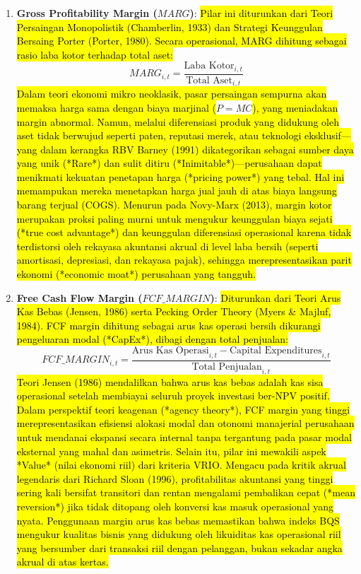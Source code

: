 \documentclass[12pt,a4paper]{article}
\providecommand{\tightlist}{%
  \setlength{\itemsep}{0pt}\setlength{\parskip}{0pt}%
}
\begin{document}
\begin{enumerate}
\def\labelenumi{\arabic{enumi}.}
\tightlist
\item
  \textbf{Gross Profitability Margin (\(MARG\))}:
  \hl{Pilar ini diturunkan dari Teori Persaingan Monopolistik (Chamberlin, 1933) dan Strategi Keunggulan Bersaing Porter (Porter, 1980). Secara operasional, MARG dihitung sebagai rasio laba kotor terhadap total aset:
  }$$MARG_{i,t} = \frac{\text{Laba Kotor}_{i,t}}{\text{Total Aset}_{i,t}}$$\hl{
  Dalam teori ekonomi mikro neoklasik, pasar persaingan sempurna akan memaksa harga sama dengan biaya marjinal (}$P=MC$\hl{), yang meniadakan margin abnormal. Namun, melalui diferensiasi produk yang didukung oleh aset tidak berwujud seperti paten, reputasi merek, atau teknologi eksklusif—yang dalam kerangka RBV Barney (1991) dikategorikan sebagai sumber daya yang unik (*Rare*) dan sulit ditiru (*Inimitable*)—perusahaan dapat menikmati kekuatan penetapan harga (*pricing power*) yang tebal. Hal ini memampukan mereka menetapkan harga jual jauh di atas biaya langsung barang terjual (COGS). Menurun pada Novy-Marx (2013), margin kotor merupakan proksi paling murni untuk mengukur keunggulan biaya sejati (*true cost advantage*) dan keunggulan diferensiasi operasional karena tidak terdistorsi oleh rekayasa akuntansi akrual di level laba bersih (seperti amortisasi, depresiasi, dan rekayasa pajak), sehingga merepresentasikan parit ekonomi (*economic moat*) perusahaan yang tangguh.}
\item
  \textbf{Free Cash Flow Margin (\(FCF\_MARGIN\))}:
  \hl{Diturunkan dari Teori Arus Kas Bebas (Jensen, 1986) serta Pecking Order Theory (Myers \& Majluf, 1984). FCF margin dihitung sebagai arus kas operasi bersih dikurangi pengeluaran modal (*CapEx*), dibagi dengan total penjualan:
  }$$FCF\_MARGIN_{i,t} = \frac{\text{Arus Kas Operasi}_{i,t} - \text{Capital Expenditures}_{i,t}}{\text{Total Penjualan}_{i,t}}$$\hl{
  Teori Jensen (1986) mendalilkan bahwa arus kas bebas adalah kas sisa operasional setelah membiayai seluruh proyek investasi ber-NPV positif. Dalam perspektif teori keagenan (*agency theory*), FCF margin yang tinggi merepresentasikan efisiensi alokasi modal dan otonomi manajerial perusahaan untuk mendanai ekspansi secara internal tanpa tergantung pada pasar modal eksternal yang mahal dan asimetris. Selain itu, pilar ini mewakili aspek *Value* (nilai ekonomi riil) dari kriteria VRIO. Mengacu pada kritik akrual legendaris dari Richard Sloan (1996), profitabilitas akuntansi yang tinggi sering kali bersifat transitori dan rentan mengalami pembalikan cepat (*mean reversion*) jika tidak ditopang oleh konversi kas masuk operasional yang nyata. Penggunaan margin arus kas bebas memastikan bahwa indeks BQS mengukur kualitas bisnis yang didukung oleh likuiditas kas operasional riil yang bersumber dari transaksi riil dengan pelanggan, bukan sekadar angka akrual di atas kertas.}

\end{enumerate}
\end{document}

